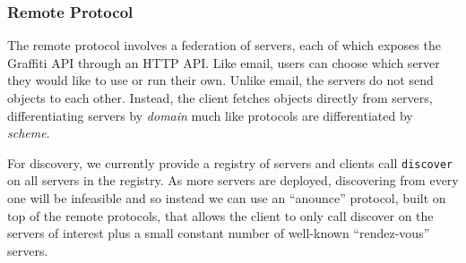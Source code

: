 





\subsubsection{Remote Protocol}
\label{above-and-below:remote-protocol}

The remote protocol involves a federation of servers,
each of which exposes the Graffiti API through an HTTP API.
Like email, users can choose which server they would
like to use or run their own.
Unlike email, the servers do not send objects to each other.
Instead, the client fetches objects directly from servers,
differentiating servers by \emph{domain} much like
protocols are differentiated by \emph{scheme}.

For discovery, we currently provide a registry of servers
and clients call \texttt{discover} on all servers in the registry.
As more servers are deployed, discovering from every one
will be infeasible and so instead we can use an ``anounce''
protocol, built on top of the remote protocols,
that allows the client to only call discover on the servers
of interest plus a small constant number of well-known
``rendez-vous'' servers.

